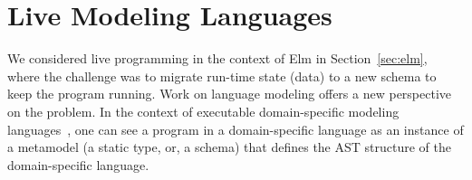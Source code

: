 \documentclass[english,crc]{programming}
\begin{document}

\section{Live Modeling Languages}
\label{sec:livemodeling}

We considered live programming in the context of Elm in Section~\ref{sec:elm},
where the challenge was to migrate run-time state (data) to a new schema to keep the program running.
Work on language modeling offers a new perspective on the problem.
In the context of executable domain-specific modeling languages~\cite{klint2011easy}, one can see a
program in a domain-specific language as an instance of a metamodel (a static type, or, a schema) that
defines the AST structure of the domain-specific language.
\end{document}
